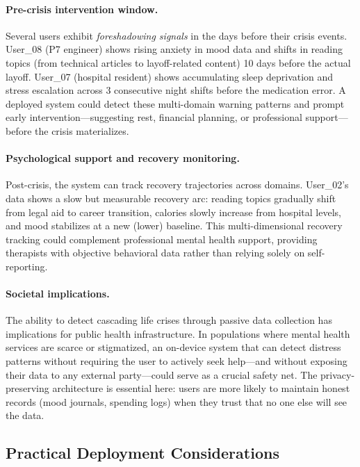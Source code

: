 \documentclass[11pt,a4paper]{article}
\begin{document}
\paragraph{Pre-crisis intervention window.}
Several users exhibit \emph{foreshadowing signals} in the days before their
crisis events. User\_08 (P7 engineer) shows rising anxiety in mood data and
shifts in reading topics (from technical articles to layoff-related content)
10 days before the actual layoff. User\_07 (hospital resident) shows
accumulating sleep deprivation and stress escalation across 3 consecutive
night shifts before the medication error. A deployed system could detect
these multi-domain warning patterns and prompt early intervention---suggesting
rest, financial planning, or professional support---before the crisis
materializes.

\paragraph{Psychological support and recovery monitoring.}
Post-crisis, the system can track recovery trajectories across domains.
User\_02's data shows a slow but measurable recovery arc: reading topics
gradually shift from legal aid to career transition, calories slowly
increase from hospital levels, and mood stabilizes at a new (lower)
baseline. This multi-dimensional recovery tracking could complement
professional mental health support, providing therapists with objective
behavioral data rather than relying solely on self-reporting.

\paragraph{Societal implications.}
The ability to detect cascading life crises through passive data collection
has implications for public health infrastructure. In populations where
mental health services are scarce or stigmatized, an on-device system that
can detect distress patterns without requiring the user to actively seek
help---and without exposing their data to any external party---could serve
as a crucial safety net. The privacy-preserving architecture is essential
here: users are more likely to maintain honest records (mood journals,
spending logs) when they trust that no one else will see the data.

\subsection{Practical Deployment Considerations}
\end{document}

